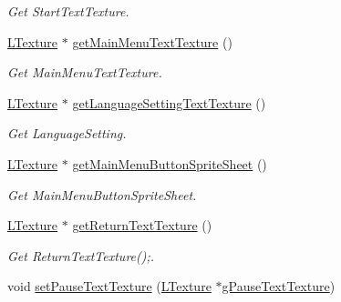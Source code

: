 \begin{DoxyCompactItemize}
\begin{DoxyCompactList}\small\item\em Get Start\+Text\+Texture. \end{DoxyCompactList}\item 
\mbox{\label{class_main_menu_a020c184279feb8d1ff393e587d259327}} 
\mbox{\hyperlink{class_l_texture}{L\+Texture}} $\ast$ \mbox{\hyperlink{class_main_menu_a020c184279feb8d1ff393e587d259327}{get\+Main\+Menu\+Text\+Texture}} ()
\begin{DoxyCompactList}\small\item\em Get Main\+Menu\+Text\+Texture. \end{DoxyCompactList}\item 
\mbox{\label{class_main_menu_a396a405f84f53c53e8cf30ded86ae7c0}} 
\mbox{\hyperlink{class_l_texture}{L\+Texture}} $\ast$ \mbox{\hyperlink{class_main_menu_a396a405f84f53c53e8cf30ded86ae7c0}{get\+Language\+Setting\+Text\+Texture}} ()
\begin{DoxyCompactList}\small\item\em Get Language\+Setting. \end{DoxyCompactList}\item 
\mbox{\label{class_main_menu_ad0bdb8ddca2327353ec8e95d1f08dbbf}} 
\mbox{\hyperlink{class_l_texture}{L\+Texture}} $\ast$ \mbox{\hyperlink{class_main_menu_ad0bdb8ddca2327353ec8e95d1f08dbbf}{get\+Main\+Menu\+Button\+Sprite\+Sheet}} ()
\begin{DoxyCompactList}\small\item\em Get Main\+Menu\+Button\+Sprite\+Sheet. \end{DoxyCompactList}\item 
\mbox{\label{class_main_menu_ab40a5dd40ac34035a500d3ced5f03a18}} 
\mbox{\hyperlink{class_l_texture}{L\+Texture}} $\ast$ \mbox{\hyperlink{class_main_menu_ab40a5dd40ac34035a500d3ced5f03a18}{get\+Return\+Text\+Texture}} ()
\begin{DoxyCompactList}\small\item\em Get Return\+Text\+Texture();. \end{DoxyCompactList}\item 
\mbox{\label{class_main_menu_a2fc36fbf411088a4cb320d21578fc002}} 
void \mbox{\hyperlink{class_main_menu_a2fc36fbf411088a4cb320d21578fc002}{set\+Pause\+Text\+Texture}} (\mbox{\hyperlink{class_l_texture}{L\+Texture}} $\ast$\mbox{\hyperlink{class_main_menu_ab95b95167c04402336873b2227515edb}{g\+Pause\+Text\+Texture}})

\end{DoxyCompactItemize}
